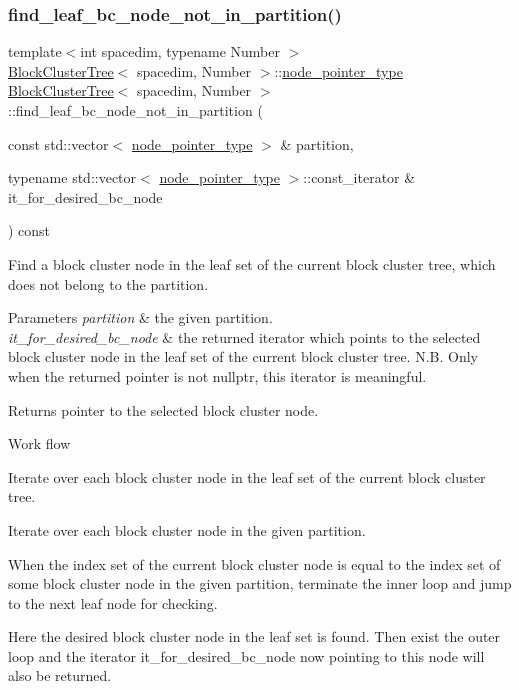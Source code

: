 \subsubsection{\texorpdfstring{find\+\_\+leaf\+\_\+bc\+\_\+node\+\_\+not\+\_\+in\+\_\+partition()}{find\_leaf\_bc\_node\_not\_in\_partition()}}
{\footnotesize\ttfamily template$<$int spacedim, typename Number $>$ \\
\hyperlink{classBlockClusterTree}{Block\+Cluster\+Tree}$<$ spacedim, Number $>$\+::\hyperlink{classTreeNode}{node\+\_\+pointer\+\_\+type} \hyperlink{classBlockClusterTree}{Block\+Cluster\+Tree}$<$ spacedim, Number $>$\+::find\+\_\+leaf\+\_\+bc\+\_\+node\+\_\+not\+\_\+in\+\_\+partition (\begin{DoxyParamCaption}\item[{const std\+::vector$<$ \hyperlink{classTreeNode}{node\+\_\+pointer\+\_\+type} $>$ \&}]{partition,  }\item[{typename std\+::vector$<$ \hyperlink{classTreeNode}{node\+\_\+pointer\+\_\+type} $>$\+::const\+\_\+iterator \&}]{it\+\_\+for\+\_\+desired\+\_\+bc\+\_\+node }\end{DoxyParamCaption}) const\hspace{0.3cm}{\ttfamily [private]}}

Find a block cluster node in the leaf set of the current block cluster tree, which does not belong to the partition. 
\begin{DoxyParams}{Parameters}
{\em partition} & the given partition. \\
\hline
{\em it\+\_\+for\+\_\+desired\+\_\+bc\+\_\+node} & the returned iterator which points to the selected block cluster node in the leaf set of the current block cluster tree. N.\+B. Only when the returned pointer is not {\ttfamily nullptr}, this iterator is meaningful. \\
\hline
\end{DoxyParams}
\begin{DoxyReturn}{Returns}
pointer to the selected block cluster node. 
\end{DoxyReturn}

\begin{DoxyDescription}
\item[Work flow ]

Iterate over each block cluster node in the leaf set of the current block cluster tree.

Iterate over each block cluster node in the given partition.

When the index set of the current block cluster node is equal to the index set of some block cluster node in the given partition, terminate the inner loop and jump to the next leaf node for checking.

Here the desired block cluster node in the leaf set is found. Then exist the outer loop and the iterator {\ttfamily it\+\_\+for\+\_\+desired\+\_\+bc\+\_\+node} now pointing to this node will also be returned.


\end{DoxyDescription}

